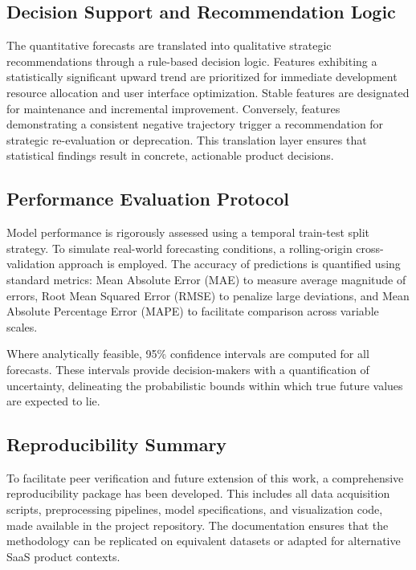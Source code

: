 \subsection{Decision Support and Recommendation Logic}
The quantitative forecasts are translated into qualitative strategic recommendations through a rule-based decision logic. Features exhibiting a statistically significant upward trend are prioritized for immediate development resource allocation and user interface optimization. Stable features are designated for maintenance and incremental improvement. Conversely, features demonstrating a consistent negative trajectory trigger a recommendation for strategic re-evaluation or deprecation. This translation layer ensures that statistical findings result in concrete, actionable product decisions.

\subsection{Performance Evaluation Protocol}
Model performance is rigorously assessed using a temporal train-test split strategy. To simulate real-world forecasting conditions, a rolling-origin cross-validation approach is employed. The accuracy of predictions is quantified using standard metrics: Mean Absolute Error (MAE) to measure average magnitude of errors, Root Mean Squared Error (RMSE) to penalize large deviations, and Mean Absolute Percentage Error (MAPE) to facilitate comparison across variable scales.

Where analytically feasible, 95\% confidence intervals are computed for all forecasts. These intervals provide decision-makers with a quantification of uncertainty, delineating the probabilistic bounds within which true future values are expected to lie.

\subsection{Reproducibility Summary}
To facilitate peer verification and future extension of this work, a comprehensive reproducibility package has been developed. This includes all data acquisition scripts, preprocessing pipelines, model specifications, and visualization code, made available in the project repository. The documentation ensures that the methodology can be replicated on equivalent datasets or adapted for alternative SaaS product contexts.
